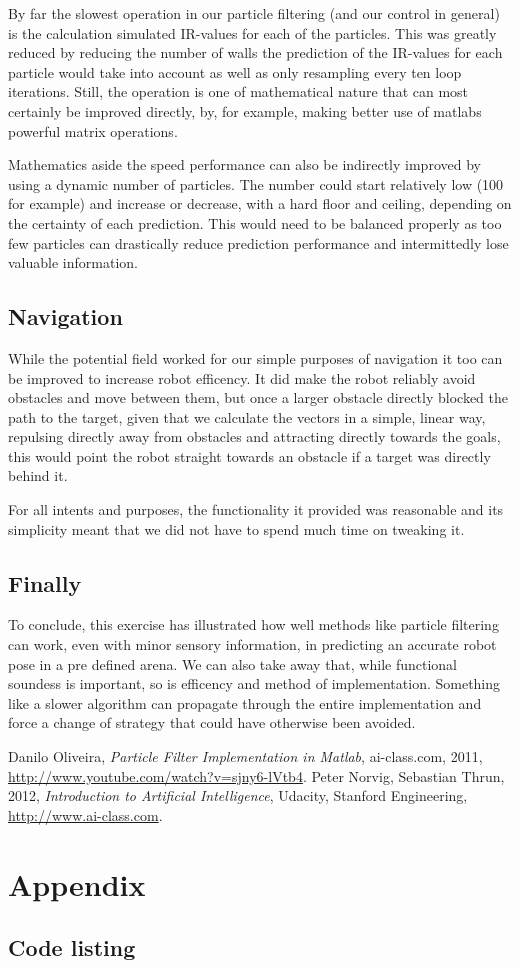 \documentclass[paper=a4, fontsize=12pt]{scrartcl}	%
\numberwithin{equation}{section}		%
\numberwithin{figure}{section}			%
\numberwithin{table}{section}				%
\begin{document}
By far the slowest operation in our particle filtering (and our control in general) is the calculation simulated IR-values for each of the particles. This was greatly reduced by reducing the number of walls the prediction of the IR-values for each particle would take into account as well as only resampling every ten loop iterations. Still, the operation is one of mathematical nature that can most certainly be improved directly, by, for example, making better use of matlabs powerful matrix operations.

Mathematics aside the speed performance can also be indirectly improved by using a dynamic number of particles. The number could start relatively low (100 for example) and increase or decrease, with a hard floor and ceiling, depending on the certainty of each prediction. This would need to be balanced properly as too few particles can drastically reduce prediction performance and intermittedly lose valuable information.
\subsection{Navigation}
While the potential field worked for our simple purposes of navigation it too can be improved to increase robot efficency. It did make the robot reliably avoid obstacles and move between them, but once a larger obstacle directly blocked the path to the target, given that we calculate the vectors in a simple, linear way, repulsing directly away from obstacles and attracting directly towards the goals, this would point the robot straight towards an obstacle if a target was directly behind it.

For all intents and purposes, the functionality it provided was reasonable and its simplicity meant that we did not have to spend much time on tweaking it.
\subsection{Finally}
To conclude, this exercise has illustrated how well methods like particle filtering can work, even with minor sensory information, in predicting an accurate robot pose in a pre defined arena. We can also take away that, while functional soundess is important, so is efficency and method of implementation. Something like a slower algorithm can propagate through the entire implementation and force a change of strategy that could have otherwise been avoided.

\begin{thebibliography}{9}
  Danilo Oliveira,
  \emph{Particle Filter Implementation in Matlab},
  ai-class.com,
  2011,
  \url{http://www.youtube.com/watch?v=sjny6-lVtb4}.
  Peter Norvig, Sebastian Thrun,
  2012,
  \emph{Introduction to Artificial Intelligence},
  Udacity, Stanford Engineering,
  \url{http://www.ai-class.com}.
\end{thebibliography}
\section{Appendix}
\subsection{Code listing}

\end{document}
